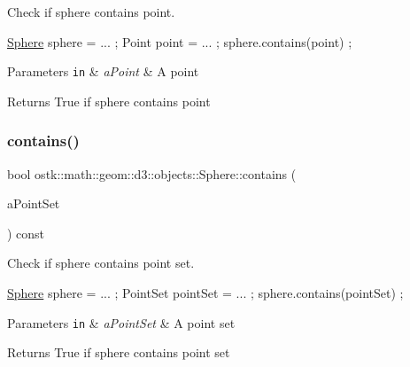 Check if sphere contains point. 


\begin{DoxyCode}
\hyperlink{classostk_1_1math_1_1geom_1_1d3_1_1objects_1_1_sphere_a6920f72260a7b2c9ffc29283540e16c2}{Sphere} sphere = ... ;
Point point = ... ;
sphere.contains(point) ;
\end{DoxyCode}



\begin{DoxyParams}[1]{Parameters}
\mbox{\tt in}  & {\em a\+Point} & A point \\
\hline
\end{DoxyParams}
\begin{DoxyReturn}{Returns}
True if sphere contains point 
\end{DoxyReturn}
\mbox{\label{classostk_1_1math_1_1geom_1_1d3_1_1objects_1_1_sphere_a91a6e5273a96a5bc92da78ea786e2ab5}} 
\subsubsection{\texorpdfstring{contains()}{contains()}\hspace{0.1cm}{\footnotesize\ttfamily [2/2]}}
{\footnotesize\ttfamily bool ostk\+::math\+::geom\+::d3\+::objects\+::\+Sphere\+::contains (\begin{DoxyParamCaption}\item[{const \hyperlink{classostk_1_1math_1_1geom_1_1d3_1_1objects_1_1_point_set}{Point\+Set} \&}]{a\+Point\+Set }\end{DoxyParamCaption}) const}



Check if sphere contains point set. 


\begin{DoxyCode}
\hyperlink{classostk_1_1math_1_1geom_1_1d3_1_1objects_1_1_sphere_a6920f72260a7b2c9ffc29283540e16c2}{Sphere} sphere = ... ;
PointSet pointSet = ... ;
sphere.contains(pointSet) ;
\end{DoxyCode}



\begin{DoxyParams}[1]{Parameters}
\mbox{\tt in}  & {\em a\+Point\+Set} & A point set \\
\hline
\end{DoxyParams}
\begin{DoxyReturn}{Returns}
True if sphere contains point set 
\end{DoxyReturn}
\mbox{\label{classostk_1_1math_1_1geom_1_1d3_1_1objects_1_1_sphere_aa99591327b0fe9aac8f03dc34b41207a}} 
